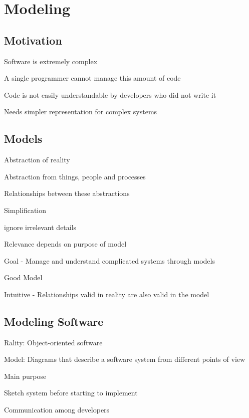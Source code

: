 \section{Modeling}

\subsection{Motivation}
\enumstart
	\item Software is extremely complex
	\item A single programmer cannot manage this amount of code
	\item Code is not easily understandable by developers who did not write it
	\item Needs simpler representation for complex systems
\enumend

\subsection{Models}
\enumstart
	\item Abstraction of reality
	\item Abstraction from things, people and processes
	\item Relationships between these abstractions
	\item Simplification
	\enumstart
		\item ignore irrelevant details
		\item Relevance depends on purpose of model
	\enumend
	\item Goal - Manage and understand complicated systems through models
	\item Good Model
	\enumstart
		\item Intuitive - Relationships valid in reality are also valid in the model
	\enumend
\enumend

\subsection{Modeling Software}
\enumstart
\item Rality: Object-oriented software
\item Model: Diagrams that describe a software system from different points of view
\item Main purpose
\enumstart
	\item Sketch system before starting to implement
	\item Communication among developers
\enumend
\enumend

